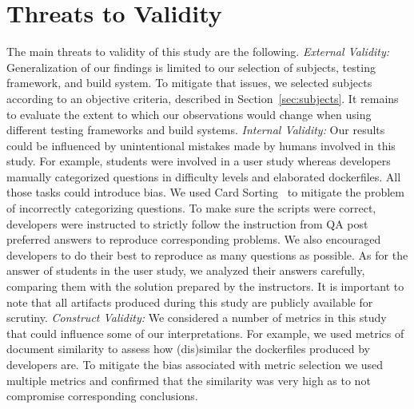 \section{Threats to Validity}

\newcommand{\QA}{QA}
\newcommand{\dockerfile}{dockerfile}
\newcommand{\SO}{StackOverflow}

The main threats to validity of this study are the following.
\textit{External Validity:} Generalization of our findings is limited
to our selection of subjects, testing framework, and build system.  To
mitigate that issues, we selected subjects according to an objective
criteria, described in Section~\ref{sec:subjects}.  It remains to
evaluate the extent to which our observations would change when using
different testing frameworks and build systems.  
\textit{Internal Validity:} Our results could be influenced by
unintentional mistakes made by humans involved in this study.  For
example, students were involved in a user study whereas developers
manually categorized questions in difficulty levels and elaborated
\dockerfile{}s.  All those tasks could introduce bias.  We used Card
Sorting~\cite{lorr1983cluster} to mitigate the problem of incorrectly
categorizing questions.  To make sure the scripts were correct,
developers were instructed to strictly follow the instruction from
\QA{} post preferred answers to reproduce corresponding problems.  We
also encouraged developers to do their best to reproduce as many
questions as possible.  As for the answer of students in the user
study, we analyzed their answers carefully, comparing them with the
solution prepared by the instructors.  It is important to note that
all artifacts produced during this study are publicly available for
scrutiny.  \textit{Construct Validity:} We considered a number of
metrics in this study that could influence some of our
interpretations.  For example, we used metrics of document similarity
to assess how (dis)similar the \dockerfile{}s produced by developers
are.  To mitigate the bias associated with metric selection we used
multiple metrics and confirmed that the similarity was very high as to
not compromise corresponding conclusions.

